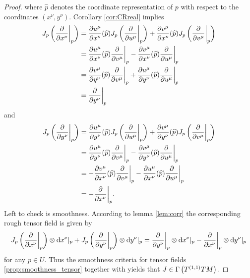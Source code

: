\begin{proof}
\noindent where $\widehat{p}$ denotes the coordinate representation of $p$ with respect to the coordinates $(x^\nu,y^\nu)$. Corollary \ref{cor:CRreal} implies
\begin{align*}
J_p\del[3]{\frac{\partial}{\partial x^\nu}\bigg\vert_p} &= \frac{\partial u^\mu}{\partial x^\nu}(\widehat{p})J_p\del[3]{\frac{\partial}{\partial u^\mu}\bigg\vert_p} + \frac{\partial v^\mu}{\partial x^\nu}(\widehat{p})J_p\del[3]{\frac{\partial}{\partial v^\mu}\bigg\vert_p}\\
&= \frac{\partial u^\mu}{\partial x^\nu}(\widehat{p})\frac{\partial}{\partial v^\mu}\bigg\vert_p - \frac{\partial v^\mu}{\partial x^\nu}(\widehat{p})\frac{\partial}{\partial u^\mu}\bigg\vert_p\\
&= \frac{\partial v^\mu}{\partial y^\nu}(\widehat{p})\frac{\partial}{\partial v^\mu}\bigg\vert_p + \frac{\partial u^\mu}{\partial y^\nu}(\widehat{p})\frac{\partial}{\partial u^\mu}\bigg\vert_p\\
&= \frac{\partial}{\partial y^\nu}\bigg\vert_p
\end{align*}
\noindent and
\begin{align*}
J_p\del[3]{\frac{\partial}{\partial y^\nu}\bigg\vert_p} &= \frac{\partial u^\mu}{\partial y^\nu}(\widehat{p})J_p\del[3]{\frac{\partial}{\partial u^\mu}\bigg\vert_p} + \frac{\partial v^\mu}{\partial y^\nu}(\widehat{p})J_p\del[3]{\frac{\partial}{\partial v^\mu}\bigg\vert_p}\\
&= \frac{\partial u^\mu}{\partial y^\nu}(\widehat{p})\frac{\partial}{\partial v^\mu}\bigg\vert_p - \frac{\partial v^\mu}{\partial y^\nu}(\widehat{p})\frac{\partial}{\partial u^\mu}\bigg\vert_p\\
&= -\frac{\partial v^\mu}{\partial x^\nu}(\widehat{p})\frac{\partial}{\partial v^\mu}\bigg\vert_p - \frac{\partial u^\mu}{\partial x^\nu}(\widehat{p})\frac{\partial}{\partial u^\mu}\bigg\vert_p\\
&= -\frac{\partial}{\partial x^\nu}\bigg\vert_p.
\end{align*}
Left to check is smoothness. According to lemma \ref{lem:corr} the corresponding rough tensor field is given by
\begin{equation*}
J_p\del[3]{\frac{\partial}{\partial x^\nu}\bigg\vert_p} \otimes \d x^\nu\vert_p + J_p\del[3]{\frac{\partial}{\partial y^\nu}\bigg\vert_p} \otimes \d y^\nu\vert_p = \frac{\partial}{\partial y^\nu}\bigg\vert_p \otimes \d x^\nu\vert_p - \frac{\partial}{\partial x^\nu}\bigg\vert_p \otimes \d y^\nu\vert_p
\end{equation*}
\noindent for any $p \in U$. Thus the smoothness criteria for tensor fields \ref{prop:smoothness_tensor} together with \cite[36]{lee:smooth_manifolds:2013} yields that $J \in \Gamma\del[1]{T^{(1,1)}TM}$.
\end{proof}

